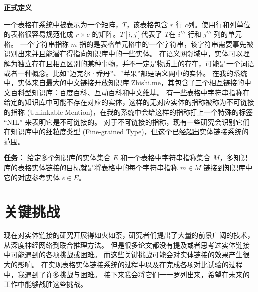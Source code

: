 \noindent\textbf{正式定义}

一个表格在系统中被表示为一个矩阵，$T$，该表格包含 $r$ 行 $c$列。使用行和列单位的表格很容易规范化成 $r\times{c}$ 的矩阵。$T[i,j]$代表了 $T$在 $i^{th}$ 行和 $j^{th}$ 列的单元格。
一个字符串指称 $m$ 指的是表格单元格中的一个字符串，该字符串需要事先被识别出来并且能潜在得指向知识库中的一些实体。
在语义网领域中，实体可以理解为独立存在且相互区别的某种事物，并不一定是物质上的存在，可能是一个词语或者一种概念。比如``迈克尔·乔丹''、``苹果''都是语义网中的实体。
在我的系统中，实体来自最大的中文链接开放知识库 Zhishi.me\cite{niu2011zhishi}，其包含了三个相互链接的中文百科型知识库：百度百科、互动百科和中文维基。
有一些表格中字符串指称在给定的知识库中可能不存在对应的实体，这样的无对应实体的指称被称为不可链接的指称 (Unlinkable Mention)，在我的系统中会给这样的指称打上一个特殊的标签 ``NIL'' 来表明它是不可链接的。
对于不可链接的指称，现有一些研究\cite{shen2012ontology}\cite{ling2012}会识别它们在知识库中的细粒度类型 (Fine-grained Type)，但这个已经超出实体链接系统的范围。\newline

\noindent\textbf{任务：} 给定多个知识库的实体集合 $E$ 和一个表格中字符串指称集合 $M$，多知识库的表格实体链接的目标就是将表格中的每个字符串指称 $m \in M$ 链接到知识库中它的对应参考实体 $e \in E$。


\section{关键挑战}

现在对实体链接的研究开展得如火如荼，研究者们提出了大量的前景广阔的技术，从深度神经网络到联合推理方法。
但是很多论文都没有提及或者思考过实体链接中可能遇到的各项挑战或困难。
而这些关键挑战可能会对实体链接的效果产生很大的影响。
在实现表格实体链接系统的过程中以及在完成各项对比试验的过程中，我遇到了许多挑战与困难。
接下来我会将它们一一罗列出来，希望在未来的工作中能够战胜这些挑战。\par


